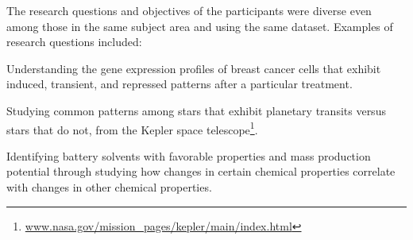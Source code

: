 \par The research questions and objectives of the participants were diverse even among those in the same subject area and using the same dataset. Examples of research questions included: 
\begin{denselist}
\item Understanding the gene expression profiles of breast cancer cells that exhibit induced, transient, and  repressed patterns after a particular treatment.
\item Studying common patterns among stars that exhibit planetary transits versus stars that do not, from the Kepler space telescope\footnote{\url{www.nasa.gov/mission_pages/kepler/main/index.html}}.
\item Identifying battery solvents with favorable properties and mass production potential through studying how changes in certain chemical properties correlate with changes in other chemical properties. 
\end{denselist}

